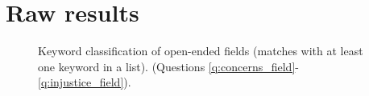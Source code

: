 \clearpage
\section{Raw results%
}\label{app:raw_results}


\begin{figure}[h!]
    \caption[Keyword classification of open-ended fields]{Keyword classification of open-ended fields (matches with at least one keyword in a list). (Questions \ref{q:concerns_field}-\ref{q:injustice_field}).
    }\label{fig:field_keyword}
\end{figure}

